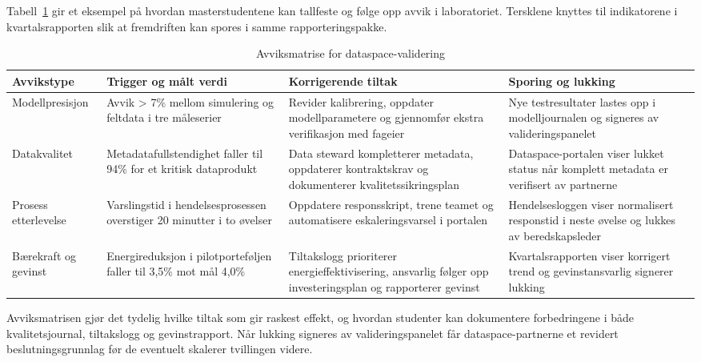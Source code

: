 Tabell~\ref{tab:avviksanalyse} gir et eksempel på hvordan masterstudentene kan tallfeste og følge opp avvik i laboratoriet. Tersklene knyttes til indikatorene i kvartalsrapporten slik at fremdriften kan spores i samme rapporteringspakke.

\begin{table}[ht]
    \centering
    \caption{Avviksmatrise for dataspace-validering}
    \label{tab:avviksanalyse}
    \begin{tabular}{|p{3.4cm}|p{4.4cm}|p{4.0cm}|p{3.6cm}|}
        \hline
        \textbf{Avvikstype} & \textbf{Trigger og målt verdi} & \textbf{Korrigerende tiltak} & \textbf{Sporing og lukking} \\
        \hline
        Modellpresisjon & Avvik \textgreater{} 7\% mellom simulering og feltdata i tre måleserier & Revider kalibrering, oppdater modellparametere og gjennomfør ekstra verifikasjon med fageier & Nye testresultater lastes opp i modelljournalen og signeres av valideringspanelet \\
        \hline
        Datakvalitet & Metadatafullstendighet faller til 94\% for et kritisk dataprodukt & Data steward kompletterer metadata, oppdaterer kontraktskrav og dokumenterer kvalitetssikringsplan & Dataspace-portalen viser lukket status når komplett metadata er verifisert av partnerne \\
        \hline
        Prosess etterlevelse & Varslingstid i hendelsesprosessen overstiger 20 minutter i to øvelser & Oppdatere responsskript, trene teamet og automatisere eskaleringsvarsel i portalen & Hendelsesloggen viser normalisert responstid i neste øvelse og lukkes av beredskapsleder \\
        \hline
        Bærekraft og gevinst & Energireduksjon i pilotporteføljen faller til 3,5\% mot mål 4,0\% & Tiltakslogg prioriterer energieffektivisering, ansvarlig følger opp investeringsplan og rapporterer gevinst & Kvartalsrapporten viser korrigert trend og gevinstansvarlig signerer lukking \citep{dfo2023baerekraft} \\
        \hline
    \end{tabular}
\end{table}

Avviksmatrisen gjør det tydelig hvilke tiltak som gir raskest effekt, og hvordan studenter kan dokumentere forbedringene i både kvalitetsjournal, tiltakslogg og gevinstrapport. Når lukking signeres av valideringspanelet får dataspace-partnerne et revidert beslutningsgrunnlag før de eventuelt skalerer tvillingen videre.

